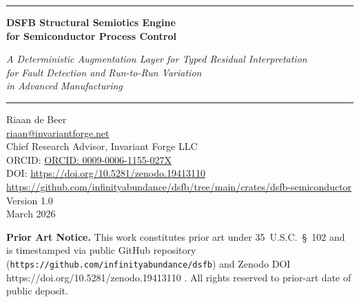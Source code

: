 \documentclass[11pt,letterpaper]{article}
\theoremstyle{scresult}
\begin{document}



\begin{center}
{\color{SCblue}\rule{\linewidth}{1.5pt}}
\vspace{8pt}

{\LARGE\bfseries\color{SCblue}
DSFB Structural Semiotics Engine\\[6pt]
for Semiconductor Process Control}

\vspace{6pt}
{\large\itshape\color{SCaccent}
A Deterministic Augmentation Layer for Typed Residual Interpretation\\
for Fault Detection and Run-to-Run Variation\\
in Advanced Manufacturing}

\vspace{8pt}
{\color{SCblue}\rule{\linewidth}{0.8pt}}

\vspace{12pt}

{\normalsize
Riaan de Beer\\
\href{mailto:riaan@invariantforge.net}{riaan@invariantforge.net}\\
Chief Research Advisor, Invariant Forge LLC\\
ORCID: \href{https://orcid.org/0009-0006-1155-027X}{ORCID: 0009-0006-1155-027X}}\\[4pt]
DOI: \href{https://doi.org/10.5281/zenodo.19413110}{https://doi.org/10.5281/zenodo.19413110}\\[2pt]
\href{https://github.com/infinityabundance/dsfb/tree/main/crates/dsfb-semiconductor}{https://github.com/infinityabundance/dsfb/tree/main/crates/dsfb-semiconductor}\\[4pt]
Version 1.0\\ 
March 2026


\vspace{4pt}
{\small\color{SCgray}
\textbf{Prior Art Notice.}
This work constitutes prior art under 35~U.S.C.~\S~102 and is
timestamped via public GitHub repository (\texttt{https://github.com/infinityabundance/dsfb})
and Zenodo DOI https://doi.org/10.5281/zenodo.19413110 .\quad
All rights reserved to prior-art date of public deposit.
}

\vspace{12pt}


\end{center}
\end{document}
